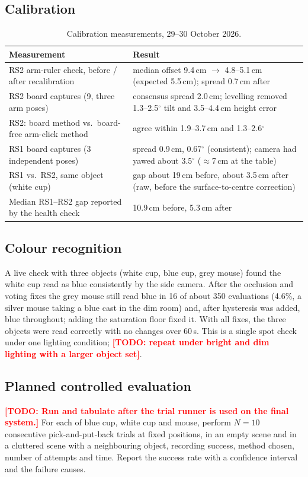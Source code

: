 \documentclass[12pt]{article}
\newcommand{\todo}[1]{\textcolor{red}{\textbf{[TODO: #1]}}}
\begin{document}
\subsection{Calibration}

\begin{table}[H]
\centering
\caption{Calibration measurements, 29--30 October 2026.}
\label{tab:calib}
\begin{tabular}{lp{7.2cm}}
\toprule
Measurement & Result \\
\midrule
RS2 arm-ruler check, before / after recalibration & median offset 9.4\,cm $\to$ 4.8--5.1\,cm (expected 5.5\,cm); spread 0.7\,cm after \\
RS2 board captures (9, three arm poses) & consensus spread 2.0\,cm; levelling removed 1.3--2.5$^\circ$ tilt and 3.5--4.4\,cm height error \\
RS2: board method vs.\ board-free arm-click method & agree within 1.9--3.7\,cm and 1.3--2.6$^\circ$ \\
RS1 board captures (3 independent poses) & spread 0.9\,cm, 0.67$^\circ$ (consistent); camera had yawed about 3.5$^\circ$ ($\approx$7\,cm at the table) \\
RS1 vs.\ RS2, same object (white cup) & gap about 19\,cm before, about 3.5\,cm after (raw, before the surface-to-centre correction) \\
Median RS1--RS2 gap reported by the health check & 10.9\,cm before, 5.3\,cm after \\
\bottomrule
\end{tabular}
\end{table}

\subsection{Colour recognition}
A live check with three objects (white cup, blue cup, grey mouse) found the white cup read as blue consistently by the side camera. After the occlusion and voting fixes the grey mouse still read blue in 16 of about 350 evaluations (4.6\%, a silver mouse taking a blue cast in the dim room) and, after hysteresis was added, blue throughout; adding the saturation floor fixed it. With all fixes, the three objects were read correctly with no changes over 60\,s. This is a single spot check under one lighting condition; \todo{repeat under bright and dim lighting with a larger object set}.

\subsection{Planned controlled evaluation}
\todo{Run and tabulate after the trial runner is used on the final system.} For each of blue cup, white cup and mouse, perform $N=10$ consecutive pick-and-put-back trials at fixed positions, in an empty scene and in a cluttered scene with a neighbouring object, recording success, method chosen, number of attempts and time. Report the success rate with a confidence interval and the failure causes.
\end{document}
